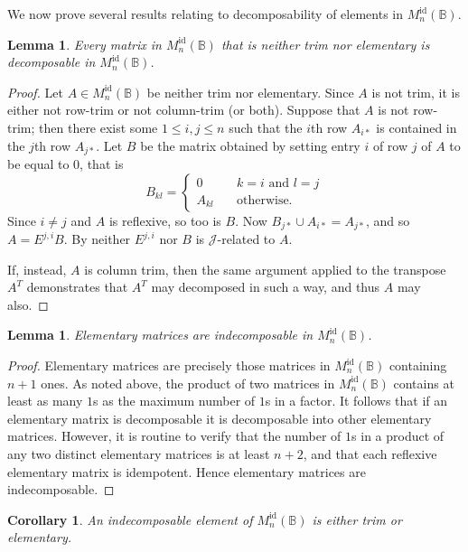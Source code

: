 \documentclass[11pt]{article}
\newtheorem{cor}[thm]{Corollary}
\newtheorem{lemma}[thm]{Lemma}
\numberwithin{equation}{section}
\newcommand{\B}{\mathbb{B}}
\newcommand{\Refln}{M_n^{\text{id}}(\B)}
\newcommand{\J}{\mathscr{J}}
\begin{document}
We now prove several results relating to decomposability of elements in $\Refln$.

\begin{lemma}
  Every matrix in $\Refln$ that is neither trim nor elementary is decomposable in
  $\Refln$.
\end{lemma}
\begin{proof}
  Let $A \in \Refln$ be neither trim nor elementary.
  Since $A$ is not trim, it is either not row-trim or not column-trim (or both).
  Suppose that $A$ is not row-trim; then there exist some $1 \leq i, j
  \leq n$ such that the $i$th row $A_{i*}$ is contained in the $j$th row
  $A_{j*}$.
  Let $B$ be the matrix obtained by setting entry $i$ of row $j$ of $A$ to be
  equal to $0$, that is
  \[B_{kl} = \begin{cases} 
                0 \quad& k = i \text{ and } l = j \\ 
                A_{kl} \quad& \text{otherwise.} 
              \end{cases} \]
  Since $i \neq j$ and $A$ is reflexive, so too is $B$. Now $B_{j*} \cup A_{i*}
  = A_{j*}$, and so $A = E^{j,i}B$. By  neither
  $E^{j,i}$ nor $B$ is $\J$-related to $A$.
  
  If, instead, $A$ is column trim, then the same argument applied to the
  transpose $A^T$ demonstrates that $A^T$ may decomposed in such a way, and thus
  $A$ may also.
\end{proof}

\begin{lemma}
  Elementary matrices are indecomposable in $\Refln$.
\end{lemma}
\begin{proof}
  Elementary matrices are precisely those matrices in $\Refln$ containing $n + 1$
  ones. As noted above, the product of two matrices in $\Refln$ contains at least
  as many $1$s as the maximum number of $1$s in a factor. It follows that if an
  elementary matrix is decomposable it is decomposable into other elementary
  matrices. However, it is routine to verify that the number of $1$s in a
  product of any two distinct elementary matrices is at least $n + 2$, and that
  each reflexive elementary matrix is idempotent. Hence elementary matrices are
  indecomposable.
\end{proof}

\begin{cor}
  An indecomposable element of $\Refln$ is either trim or elementary.
\end{cor}
\end{document}
